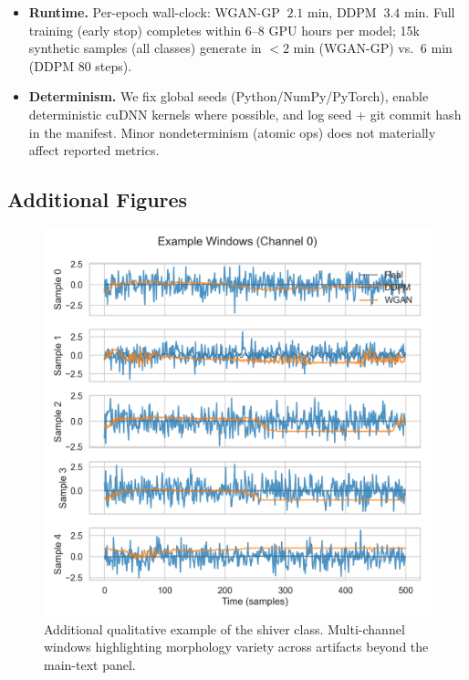 \documentclass{article}
\begin{document}
\begin{itemize}
    \item \textbf{Runtime.} Per-epoch wall-clock: WGAN-GP \(~2.1\) min, DDPM \(~3.4\) min. Full training (early stop) completes within 6--8 GPU hours per model; 15k synthetic samples (all classes) generate in \(<\!2\) min (WGAN-GP) vs. \(~6\) min (DDPM 80 steps).
    \item \textbf{Determinism.} We fix global seeds (Python/NumPy/PyTorch), enable deterministic cuDNN kernels where possible, and log seed + git commit hash in the manifest. Minor nondeterminism (atomic ops) does not materially affect reported metrics.
\end{itemize}

\subsection{Additional Figures}
\begin{figure}[t]
  \centering
  \includegraphics[width=0.95\linewidth]{figs/examples_windows.png}
  \caption{Additional qualitative example of the shiver class. Multi-channel windows highlighting morphology variety across artifacts beyond the main-text panel.}
  \label{fig:app-examples}
\end{figure}
\end{document}

